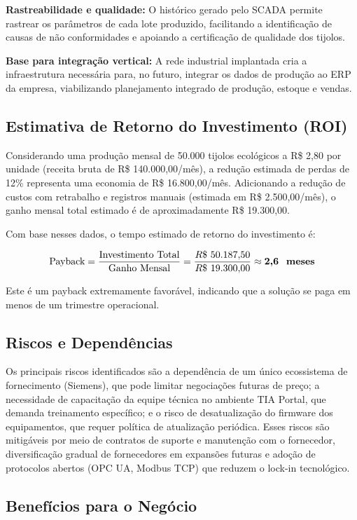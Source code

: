 \documentclass[12pt,a4paper]{article}
\begin{document}
\textbf{Rastreabilidade e qualidade:} O histórico gerado pelo SCADA permite rastrear
os parâmetros de cada lote produzido, facilitando a identificação de causas de
não conformidades e apoiando a certificação de qualidade dos tijolos.

\textbf{Base para integração vertical:} A rede industrial implantada cria a infraestrutura
necessária para, no futuro, integrar os dados de produção ao ERP da empresa, viabilizando
planejamento integrado de produção, estoque e vendas.

\subsection{Estimativa de Retorno do Investimento (ROI)}

Considerando uma produção mensal de 50.000 tijolos ecológicos a R\$ 2,80 por unidade
(receita bruta de R\$ 140.000,00/mês), a redução estimada de perdas de 12\% representa
uma economia de R\$ 16.800,00/mês. Adicionando a redução de custos com retrabalho e
registros manuais (estimada em R\$ 2.500,00/mês), o ganho mensal total estimado é de
aproximadamente R\$ 19.300,00.

Com base nesses dados, o tempo estimado de retorno do investimento é:

\[
\text{Payback} = \frac{\text{Investimento Total}}{\text{Ganho Mensal}} = \frac{R\$\ 50.187{,}50}{R\$\ 19.300{,}00} \approx \textbf{2{,}6 \text{ meses}}
\]

Este é um payback extremamente favorável, indicando que a solução se paga em menos
de um trimestre operacional.

\subsection{Riscos e Dependências}

Os principais riscos identificados são a dependência de um único ecossistema de
fornecimento (Siemens), que pode limitar negociações futuras de preço; a necessidade
de capacitação da equipe técnica no ambiente TIA Portal, que demanda treinamento
específico; e o risco de desatualização do firmware dos equipamentos, que requer
política de atualização periódica. Esses riscos são mitigáveis por meio de contratos
de suporte e manutenção com o fornecedor, diversificação gradual de fornecedores
em expansões futuras e adoção de protocolos abertos (OPC UA, Modbus TCP) que
reduzem o lock-in tecnológico.

\subsection{Benefícios para o Negócio}
\end{document}
